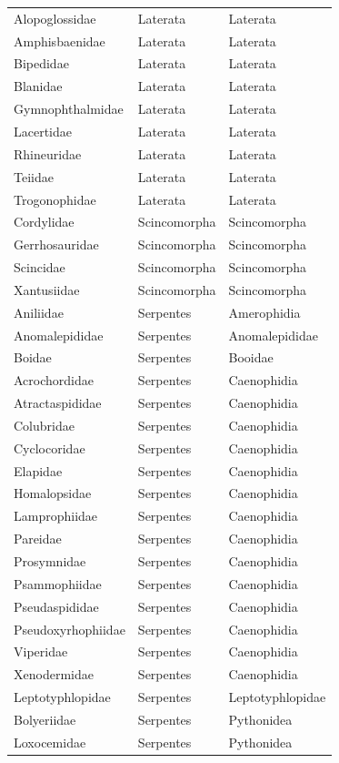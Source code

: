\documentclass[a4paper, 12pt]{article}
\begin{document}
\begin{longtable}{lll}
Alopoglossidae & Laterata & Laterata \\
Amphisbaenidae & Laterata & Laterata \\
Bipedidae & Laterata & Laterata \\
Blanidae & Laterata & Laterata \\
Gymnophthalmidae & Laterata & Laterata \\
Lacertidae & Laterata & Laterata \\
Rhineuridae & Laterata & Laterata \\
Teiidae & Laterata & Laterata \\
Trogonophidae & Laterata & Laterata \\
Cordylidae & Scincomorpha & Scincomorpha \\
Gerrhosauridae & Scincomorpha & Scincomorpha \\
Scincidae & Scincomorpha & Scincomorpha \\
Xantusiidae & Scincomorpha & Scincomorpha \\
Aniliidae & Serpentes & Amerophidia \\
Anomalepididae & Serpentes & Anomalepididae \\
Boidae & Serpentes & Booidae \\
Acrochordidae & Serpentes & Caenophidia \\
Atractaspididae & Serpentes & Caenophidia \\
Colubridae & Serpentes & Caenophidia \\
Cyclocoridae & Serpentes & Caenophidia \\
Elapidae & Serpentes & Caenophidia \\
Homalopsidae & Serpentes & Caenophidia \\
Lamprophiidae & Serpentes & Caenophidia \\
Pareidae & Serpentes & Caenophidia \\
Prosymnidae & Serpentes & Caenophidia \\
Psammophiidae & Serpentes & Caenophidia \\
Pseudaspididae & Serpentes & Caenophidia \\
Pseudoxyrhophiidae & Serpentes & Caenophidia \\
Viperidae & Serpentes & Caenophidia \\
Xenodermidae & Serpentes & Caenophidia \\
Leptotyphlopidae & Serpentes & Leptotyphlopidae \\
Bolyeriidae & Serpentes & Pythonidea \\
Loxocemidae & Serpentes & Pythonidea \\

\end{longtable}
\end{document}
